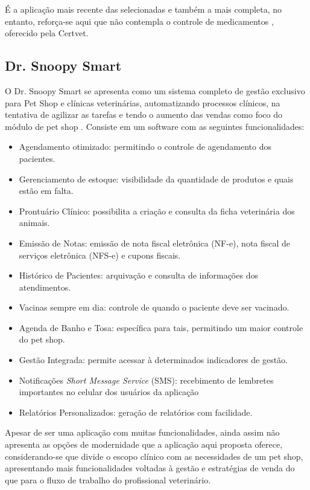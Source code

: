 \documentclass[
    12pt,               %
    openright,          %
    oneside,
    a4paper,            %
    BIBLATEX,           %
    TODO,               %
    english,            %
    brazil              %
    ]{ifsp-spo-inf-ctds}
\begin{document}
    É a aplicação mais recente das selecionadas e também a mais completa, no entanto, reforça-se aqui que não contempla o controle de medicamentos , oferecido pela Certvet.

        \subsection{Dr. Snoopy Smart}
        O Dr. Snoopy Smart se apresenta como um sistema completo de gestão exclusivo para Pet Shop e clínicas veterinárias, automatizando processos clínicos, na tentativa de agilizar as tarefas e tendo o aumento das vendas como foco do módulo de pet shop . Consiste em um software com as seguintes funcionalidades:

\begin{itemize}
    \item Agendamento otimizado: permitindo o controle de agendamento dos pacientes.
    \item Gerenciamento de estoque: visibilidade da quantidade de produtos e quais estão em falta.
    \item Prontuário Clínico: possibilita a criação e consulta da ficha veterinária dos animais.
    \item Emissão de Notas: emissão de nota fiscal eletrônica (NF-e), nota fiscal de serviços eletrônica (NFS-e) e cupons fiscais.
    \item Histórico de Pacientes: arquivação e consulta de informações dos atendimentos. 
    \item Vacinas sempre em dia: controle de quando o paciente deve ser vacinado.
    \item Agenda de Banho e Tosa: específica para tais, permitindo um maior controle do pet shop.
    \item Gestão Integrada: permite acessar à determinados indicadores de gestão.
    \item Notificações \emph{Short Message Service} (SMS): recebimento de lembretes importantes no celular dos usuários da aplicação
    \item Relatórios Personalizados: geração de relatórios com facilidade.
\end{itemize}

    Apesar de ser uma aplicação com muitas funcionalidades, ainda assim não apresenta as opções de modernidade que a aplicação aqui proposta oferece, considerando-se que divide o escopo clínico com as necessidades de um pet shop, apresentando mais funcionalidades voltadas à gestão e estratégias de venda do que para o fluxo de trabalho do profissional veterinário.
\end{document}
